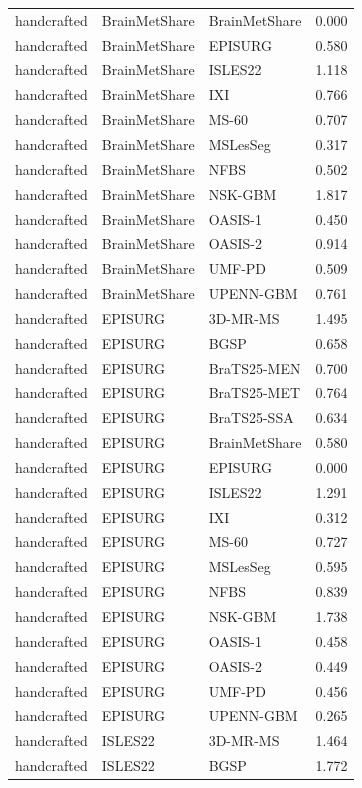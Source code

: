 \begin{tabular}{lllr}
handcrafted & BrainMetShare & BrainMetShare & 0.000 \\
handcrafted & BrainMetShare & EPISURG & 0.580 \\
handcrafted & BrainMetShare & ISLES22 & 1.118 \\
handcrafted & BrainMetShare & IXI & 0.766 \\
handcrafted & BrainMetShare & MS-60 & 0.707 \\
handcrafted & BrainMetShare & MSLesSeg & 0.317 \\
handcrafted & BrainMetShare & NFBS & 0.502 \\
handcrafted & BrainMetShare & NSK-GBM & 1.817 \\
handcrafted & BrainMetShare & OASIS-1 & 0.450 \\
handcrafted & BrainMetShare & OASIS-2 & 0.914 \\
handcrafted & BrainMetShare & UMF-PD & 0.509 \\
handcrafted & BrainMetShare & UPENN-GBM & 0.761 \\
handcrafted & EPISURG & 3D-MR-MS & 1.495 \\
handcrafted & EPISURG & BGSP & 0.658 \\
handcrafted & EPISURG & BraTS25-MEN & 0.700 \\
handcrafted & EPISURG & BraTS25-MET & 0.764 \\
handcrafted & EPISURG & BraTS25-SSA & 0.634 \\
handcrafted & EPISURG & BrainMetShare & 0.580 \\
handcrafted & EPISURG & EPISURG & 0.000 \\
handcrafted & EPISURG & ISLES22 & 1.291 \\
handcrafted & EPISURG & IXI & 0.312 \\
handcrafted & EPISURG & MS-60 & 0.727 \\
handcrafted & EPISURG & MSLesSeg & 0.595 \\
handcrafted & EPISURG & NFBS & 0.839 \\
handcrafted & EPISURG & NSK-GBM & 1.738 \\
handcrafted & EPISURG & OASIS-1 & 0.458 \\
handcrafted & EPISURG & OASIS-2 & 0.449 \\
handcrafted & EPISURG & UMF-PD & 0.456 \\
handcrafted & EPISURG & UPENN-GBM & 0.265 \\
handcrafted & ISLES22 & 3D-MR-MS & 1.464 \\
handcrafted & ISLES22 & BGSP & 1.772 \\

\end{tabular}
